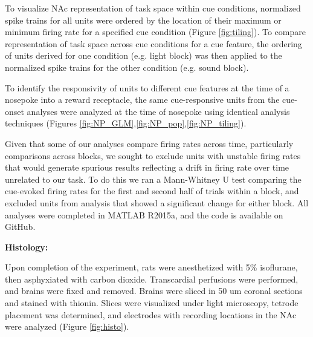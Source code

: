 \documentclass[11pt]{article}
\begin{document}
To visualize NAc representation of task space within cue conditions, normalized spike trains for all units were ordered by the location of their maximum or minimum firing rate for a specified cue condition (Figure \ref{fig:tiling}). To compare representation of task space across cue conditions for a cue feature, the ordering of units derived for one condition (e.g. light block) was then applied to the normalized spike trains for the other condition (e.g. sound block). 

To identify the responsivity of units to different cue features at the time of a nosepoke into a reward receptacle, the same cue-responsive units from the cue-onset analyses were analyzed at the time of nosepoke using identical analysis techniques (Figures \ref{fig:NP_GLM},\ref{fig:NP_pop},\ref{fig:NP_tiling}).

Given that some of our analyses compare firing rates across time, particularly comparisons across blocks, we sought to exclude units with unstable firing rates that would generate spurious results reflecting a drift in firing rate over time unrelated to our task. To do this we ran a Mann-Whitney U test comparing the cue-evoked firing rates for the first and second half of trials within a block, and excluded units from analysis that showed a significant change for either block.  All analyses were completed in MATLAB R2015a, and the code is available on GitHub.


{\bf Histology:}

Upon completion of the experiment, rats were anesthetized with 5\% isoflurane, then asphyxiated with carbon dioxide. Transcardial perfusions were performed, and brains were fixed and removed. Brains were sliced in 50 um coronal sections and stained with thionin. Slices were visualized under light microscopy, tetrode placement was determined, and electrodes with recording locations in the NAc were analyzed (Figure \ref{fig:histo}).
\end{document}
